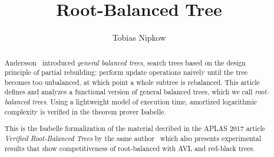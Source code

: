 \documentclass[11pt,a4paper]{article}
\begin{document}
\title{Root-Balanced Tree}
\author{Tobias Nipkow}
\maketitle

\begin{abstract}
  Andersson~\cite{Andersson89,Andersson99} introduced \emph{general balanced trees},
  search trees based on the design principle of partial rebuilding:
  perform update operations naively until the tree becomes too
  unbalanced, at which point a whole subtree is rebalanced.  This article
  defines and analyzes a functional version of general balanced trees,
  which we call \emph{root-balanced trees}.  Using a lightweight model
  of execution time, amortized logarithmic complexity is verified in
  the theorem prover Isabelle.

This is the Isabelle formalization of the material decribed in the
APLAS 2017 article \emph{Verified Root-Balanced Trees} by the same
author~\cite{Nipkow-APLAS2017} which also presents experimental results that show
competitiveness of root-balanced with AVL and red-black trees.
\end{abstract}





\end{document}

